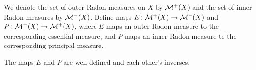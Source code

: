 \documentclass[article, a4paper, 11pt, oneside]{memoir}
\numberwithin{equation}{chapter}
\begin{document}
\newcommand{\mylistlabelfont}[1]{{\normalfont\color{linkcolor}\textit{#1}:}}

We denote the set of outer Radon measures on $X$ by $\mathcal{M}^{+}(X)$ and the set of inner Radon measures by $\mathcal{M}^{-}(X)$. Define maps $E \colon \mathcal{M}^{+}(X) \to \mathcal{M}^{-}(X)$ and $P \colon \mathcal{M}^{-}(X) \to \mathcal{M}^{+}(X)$, where $E$ maps an outer Radon measure to the corresponding essential measure, and $P$ maps an inner Radon measure to the corresponding principal measure.

\begin{theorem}
    \label{thm:Radon-pair-inverses}
    The maps $E$ and $P$ are well-defined and each other's inverses.
\end{theorem}
\end{document}
